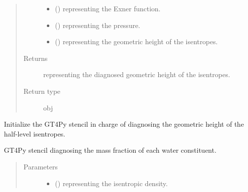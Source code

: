 \documentclass[letterpaper,10pt,english]{sphinxmanual}
\begin{document}
\begin{fulllineitems}
\begin{fulllineitems}
\begin{quote}
\begin{description}
\begin{itemize}
\item {} 
 () \textendash{}  representing the Exner function.

\item {} 
 () \textendash{}  representing the pressure.

\item {} 
 () \textendash{}  representing the geometric height of the isentropes.

\end{itemize}

\item[{Returns}] \leavevmode
{} representing the diagnosed geometric height of the isentropes.

\item[{Return type}] \leavevmode
obj

\end{description}\end{quote}

\end{fulllineitems}


\begin{fulllineitems}
\label{\detokenize{api:dycore.diagnostic_isentropic.DiagnosticIsentropic._stencil_diagnosing_height_initialize}}
Initialize the GT4Py stencil in charge of diagnosing the geometric height of the half-level isentropes.

\end{fulllineitems}


\begin{fulllineitems}
\label{\detokenize{api:dycore.diagnostic_isentropic.DiagnosticIsentropic._stencil_diagnosing_mass_fraction_of_water_constituents_in_air_defs}}
GT4Py stencil diagnosing the mass fraction of each water constituent.
\begin{quote}\begin{description}
\item[{Parameters}] \leavevmode\begin{itemize}
\item {} 
 () \textendash{}  representing the isentropic density.


\end{itemize}
\end{description}
\end{quote}
\end{fulllineitems}
\end{fulllineitems}
\end{document}
